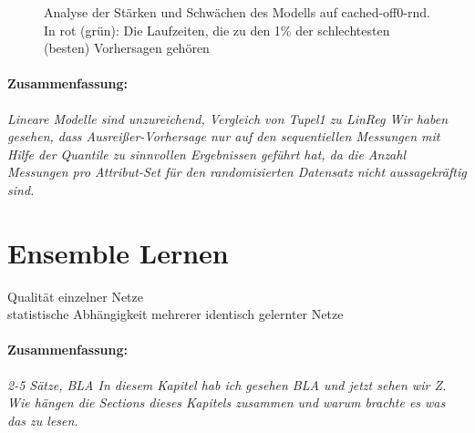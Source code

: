 \documentclass[
	12pt,
	a4paper,
	BCOR10mm,
	DIV14,
	listof=totoc,
	bibliography=totoc,
	headsepline
]{scrreprt}
\begin{document}
\begin{figure}
	\centering
	\caption{Analyse der Stärken und Schwächen des Modells auf cached-off0-rnd. In rot (grün): Die Laufzeiten, die zu den 1\% der schlechtesten (besten) Vorhersagen gehören}
	\label{fig:tupel2_biggest_smallest_rnd}
\end{figure} 

\paragraph{Zusammenfassung:}
\textit{
	Lineare Modelle sind unzureichend, Vergleich von Tupel1 zu LinReg
	Wir haben gesehen, dass Ausreißer-Vorhersage nur auf den sequentiellen Messungen mit Hilfe der Quantile zu sinnvollen Ergebnissen geführt hat, da die Anzahl Messungen pro Attribut-Set für den randomisierten Datensatz nicht aussagekräftig sind.
	}
\clearpage

\section{Ensemble Lernen}
Qualität einzelner Netze\\
statistische Abhängigkeit mehrerer identisch gelernter Netze

\paragraph{Zusammenfassung:}
\textit{2-5 Sätze, BLA In diesem Kapitel hab ich gesehen BLA und jetzt sehen wir Z. Wie hängen die Sections dieses Kapitels zusammen und warum brachte es was das zu lesen.}
\end{document}
